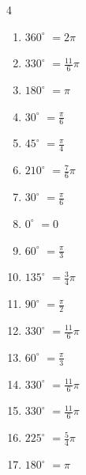 \begin{multicols}{4}
\begin{enumerate}
  \item $\displaystyle 360^{\circ}$
        $\displaystyle =2\pi$

  \item $\displaystyle 330^{\circ}$
        $\displaystyle =\frac{11}{6}\pi$

  \item $\displaystyle 180^{\circ}$
        $\displaystyle =\pi$

  \item $\displaystyle 30^{\circ}$
        $\displaystyle =\frac{\pi}{6}$

  \item $\displaystyle 45^{\circ}$
        $\displaystyle =\frac{\pi}{4}$

  \item $\displaystyle 210^{\circ}$
        $\displaystyle =\frac{7}{6}\pi$

  \item $\displaystyle 30^{\circ}$
        $\displaystyle =\frac{\pi}{6}$

  \item $\displaystyle 0^{\circ}$
        $\displaystyle =0$

  \item $\displaystyle 60^{\circ}$
        $\displaystyle =\frac{\pi}{3}$

  \item $\displaystyle 135^{\circ}$
        $\displaystyle =\frac{3}{4}\pi$

  \item $\displaystyle 90^{\circ}$
        $\displaystyle =\frac{\pi}{2}$

  \item $\displaystyle 330^{\circ}$
        $\displaystyle =\frac{11}{6}\pi$

  \item $\displaystyle 60^{\circ}$
        $\displaystyle =\frac{\pi}{3}$

  \item $\displaystyle 330^{\circ}$
        $\displaystyle =\frac{11}{6}\pi$

\columnbreak %

\resetques

  \item $\displaystyle 330^{\circ}$
        $\displaystyle =\frac{11}{6}\pi$

  \item $\displaystyle 225^{\circ}$
        $\displaystyle =\frac{5}{4}\pi$

  \item $\displaystyle 180^{\circ}$
        $\displaystyle =\pi$


\end{enumerate}
\end{multicols}
